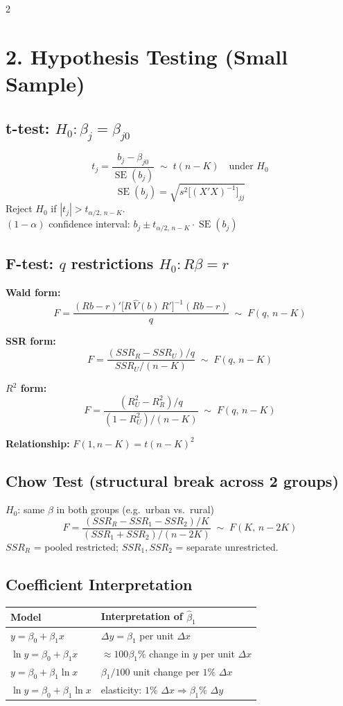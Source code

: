 \documentclass[9pt,a4paper]{article}
\begin{document}
\begin{multicols}{2}
\section{2.\; Hypothesis Testing (Small Sample)}

\subsection*{t-test: $H_0\colon \beta_j = \beta_{j0}$}
\[
  t_j = \frac{b_j - \beta_{j0}}{\operatorname{SE}(b_j)} \;\sim\; t(n-K) \quad\text{under }H_0
\]
\[
  \operatorname{SE}(b_j) = \sqrt{s^2\bigl[(X'X)^{-1}\bigr]_{jj}}
\]
Reject $H_0$ if $|t_j| > t_{\alpha/2,\,n-K}$.\\
$(1-\alpha)$ confidence interval: $b_j \pm t_{\alpha/2,\,n-K}\cdot\operatorname{SE}(b_j)$

\subsection*{F-test: $q$ restrictions $H_0\colon R\beta = r$}

\textbf{Wald form:}
\[
  F = \frac{(Rb-r)'\bigl[R\,\widehat{V}(b)\,R'\bigr]^{-1}(Rb-r)}{q} \;\sim\; F(q,\,n-K)
\]

\textbf{SSR form:}
\[
  F = \frac{(SSR_R - SSR_U)/q}{SSR_U/(n-K)} \;\sim\; F(q,\,n-K)
\]

\textbf{$R^2$ form:}
\[
  F = \frac{(R^2_U - R^2_R)/q}{(1-R^2_U)/(n-K)} \;\sim\; F(q,\,n-K)
\]

\textbf{Relationship:} $F(1,n-K) = t(n-K)^2$

\subsection*{Chow Test (structural break across 2 groups)}
$H_0$: same $\beta$ in both groups (e.g.\ urban vs.\ rural)
\[
  F = \frac{(SSR_R - SSR_1 - SSR_2)/K}{(SSR_1+SSR_2)/(n-2K)} \;\sim\; F(K,\,n-2K)
\]
$SSR_R$ = pooled restricted; $SSR_1, SSR_2$ = separate unrestricted.

\subsection*{Coefficient Interpretation}
\begin{tabular}{@{}lp{5cm}@{}}
  \toprule
  Model & Interpretation of $\hat\beta_1$ \\
  \midrule
  $y = \beta_0+\beta_1 x$ & $\Delta y = \beta_1$ per unit $\Delta x$ \\
  $\ln y = \beta_0+\beta_1 x$ & $\approx 100\beta_1\%$ change in $y$ per unit $\Delta x$ \\
  $y = \beta_0+\beta_1\ln x$ & $\beta_1/100$ unit change per $1\%$ $\Delta x$ \\
  $\ln y = \beta_0+\beta_1\ln x$ & elasticity: $1\%$ $\Delta x \Rightarrow \beta_1\%$ $\Delta y$ \\
  \bottomrule
\end{tabular}


\end{multicols}
\end{document}
